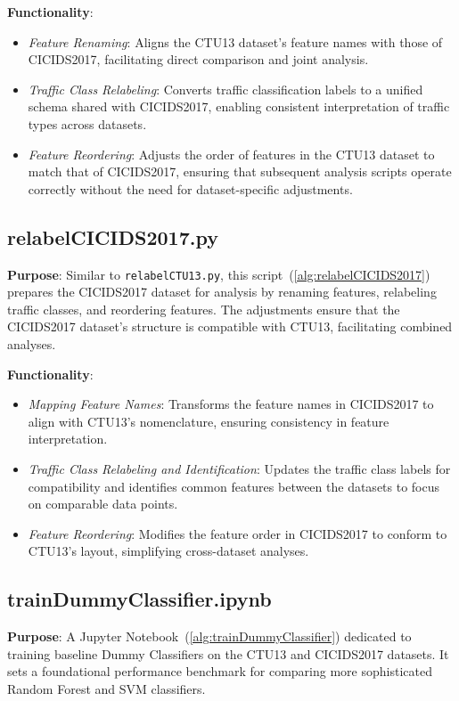 \textbf{Functionality}:
\begin{itemize}
    \item \textit{Feature Renaming}: Aligns the CTU13 dataset's feature names with those of CICIDS2017, facilitating direct comparison and joint analysis.
    \item \textit{Traffic Class Relabeling}: Converts traffic classification labels to a unified schema shared with CICIDS2017, enabling consistent interpretation of traffic types across datasets.
    \item \textit{Feature Reordering}: Adjusts the order of features in the CTU13 dataset to match that of CICIDS2017, ensuring that subsequent analysis scripts operate correctly without the need for dataset-specific adjustments.
\end{itemize}

\subsection{relabelCICIDS2017.py}
\textbf{Purpose}: Similar to \texttt{relabelCTU13.py}, this script~(\ref{alg:relabelCICIDS2017}) prepares the CICIDS2017 dataset for analysis by renaming features, relabeling traffic classes, and reordering features. The adjustments ensure that the CICIDS2017 dataset's structure is compatible with CTU13, facilitating combined analyses.

\textbf{Functionality}:
\begin{itemize}
    \item \textit{Mapping Feature Names}: Transforms the feature names in CICIDS2017 to align with CTU13’s nomenclature, ensuring consistency in feature interpretation.
    \item \textit{Traffic Class Relabeling and Identification}: Updates the traffic class labels for compatibility and identifies common features between the datasets to focus on comparable data points.
    \item \textit{Feature Reordering}: Modifies the feature order in CICIDS2017 to conform to CTU13's layout, simplifying cross-dataset analyses.
\end{itemize}

\subsection{trainDummyClassifier.ipynb}
\textbf{Purpose}: A Jupyter Notebook~(\ref{alg:trainDummyClassifier}) dedicated to training baseline Dummy Classifiers on the CTU13 and CICIDS2017 datasets. It sets a foundational performance benchmark for comparing more sophisticated Random Forest and SVM classifiers.

